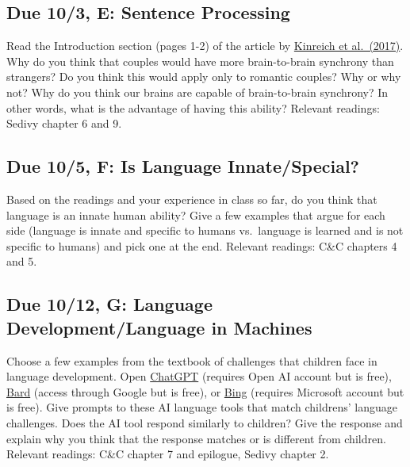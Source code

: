 \documentclass[
  letterpaper,
  DIV=11,
  numbers=noendperiod]{scrreprt}
\begin{document}

\hypertarget{due-103-e-sentence-processing}{%
\subsection*{Due 10/3, E: Sentence
Processing}\label{due-103-e-sentence-processing}}

Read the Introduction section (pages 1-2) of the article by
\href{papers/Kinreichetal2017.pdf}{Kinreich et al.~(2017)}. Why do you
think that couples would have more brain-to-brain synchrony than
strangers? Do you think this would apply only to romantic couples? Why
or why not? Why do you think our brains are capable of brain-to-brain
synchrony? In other words, what is the advantage of having this ability?
Relevant readings: Sedivy chapter 6 and 9.

\hypertarget{due-105-f-is-language-innatespecial}{%
\subsection*{Due 10/5, F: Is Language
Innate/Special?}\label{due-105-f-is-language-innatespecial}}

Based on the readings and your experience in class so far, do you think
that language is an innate human ability? Give a few examples that argue
for each side (language is innate and specific to humans vs.~language is
learned and is not specific to humans) and pick one at the end. Relevant
readings: C\&C chapters 4 and 5.

\hypertarget{due-1012-g-language-developmentlanguage-in-machines}{%
\subsection*{Due 10/12, G: Language Development/Language in
Machines}\label{due-1012-g-language-developmentlanguage-in-machines}}

Choose a few examples from the textbook of challenges that children face
in language development. Open \href{https://chat.openai.com/}{ChatGPT}
(requires Open AI account but is free),
\href{https://bard.google.com/}{Bard} (access through Google but is
free), or \href{https://www.bing.com/?scope=web\&FORM=HDRSC2}{Bing}
(requires Microsoft account but is free). Give prompts to these AI
language tools that match childrens' language challenges. Does the AI
tool respond similarly to children? Give the response and explain why
you think that the response matches or is different from children.
Relevant readings: C\&C chapter 7 and epilogue, Sedivy chapter 2.
\end{document}
